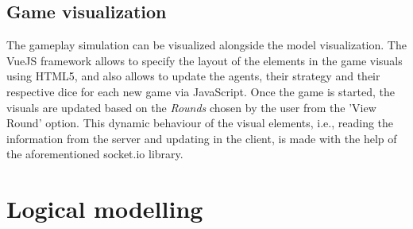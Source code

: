 \documentclass{article}
\begin{document}
\subsection*{Game visualization}%
The gameplay simulation can be visualized alongside the model visualization. The VueJS framework allows to specify the layout of the elements in the game visuals using HTML5, and also allows to update the agents, their strategy and their respective dice for each new game via JavaScript. Once the game is started, the visuals are updated based on the \textit{Rounds} chosen by the user from the 'View Round' option. This dynamic behaviour of the visual elements, i.e., reading the information from the server and updating in the client, is made with the help of the aforementioned socket.io library. 





\section*{Logical modelling}
\end{document}

